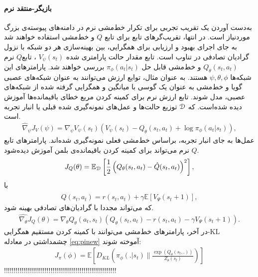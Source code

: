  \paragraph{بازیگر-منتقد نرم}
به‌دست آوردن یک تقریب تجربی برای تکرار خط‌مشی نرم در دامنه‌های پیوسته‌ی بزرگ موردنیاز است.  در انتها، تقریب‌گرهای تابع برای تابع
$ Q$
 و خط‌مشی استفاده خواهند شد به جای اجرای بهبود و ارزیابی برای همگرایی، بین بهینه‌سازی هر دو شبکه با نزول گرادیان تصادفی در تناوب است. تابع مقدار حالت پارامتری شده
 $V_\psi (s_t)$
 ، تابع$Q$ نرم 
 $Q_\theta (s_t,a_t)$
  و خط‌مشی قابل حل 
  $\pi_\phi (a_t | s_t)$
  بررسی خواهند شد. پارامترهای این شبکه‌ها 
  $\psi, \theta, \phi$
   هستند. به عنوان مثال، توابع ارزش می‌توانند به عنوان شبکه‌های عصبی گویا و خط‌مشی به عنوان یک گوسی با میانگین و همگرایی گرفته شده از شبکه‌های عصبی، مدل شوند.
تابع ارزش نرم برای کمینه کردن مربع خطای باقیمانده‌ها آموزش دیده شده‌است.
که 
$\EuScript{D}$
 توزیع حالت‌ها و عمل‌های نمونه‌گیری شده قبلی یا انبار تجربه
  است.
\begin{align}
\hat{\nabla}_\psi J_V (\psi) = \nabla_\psi V_\psi (s_t) (V_\psi (s_t)-Q_\theta(s_t,a_t)+\log \pi_\phi (a_t |s_t)) ,
\end{align}
عمل‌ها به جای انبار تجربه، براساس خط‌مشی فعلی نمونه‌گیری شده‌اند. پارامترهای تابع $Q$ نرم می‌تواند برای کمینه کردن باقیمانده‌ی بلمن آموزش دیده‌شود.
\begin{align}
J_Q(\theta) = \mathbb{E}_{\EuScript{D}} \left[ \frac{1}{2} \left( Q_\theta (s_t,a_t)- \hat{Q} (s_t,a_t)\right)^2 \right] ,
\end{align}
با 
\begin{align*}
\hat{Q} (s_t,a_t) = r(s_t,a_t) + \gamma \mathbb{E} [V_\Psi (s_t+1)] ,
\end{align*}
که می‌تواند مجددا با گرادیان‌های تصادفی بهینه شود.
\begin{align}
\hat{\nabla_{\theta}} J_Q (\theta) = \nabla_\theta Q_\theta (a_t,s_t) \left( Q_\theta (s_t,a_t)- r(s_t,a_t) - \gamma V_\Psi (s_t+1) \right). 
\label{eq:hatnabla}
\end{align}
در آخر، پارامترهای خط‌مشی می‌توانند با کمینه کردن مستقیم همگرایی-KL چشمداشتی در معادله \ref{eq:pinew} آموخته شوند:
\begin{align}
J_\pi(\phi) = \mathbb{E}\left[ D_{KL}  \left( \pi_\phi(.|s_t) \parallel \frac{\exp{(Q_{\theta} (s_t,.))}}{Z_{\theta} (s_t)}\right) \right]
\end{align}
!!!!!!!!!!!!!!!!!!!!!!!!!!!!!!!!!!!!!!!!!!!!!!!!!!!!!!!!!!
